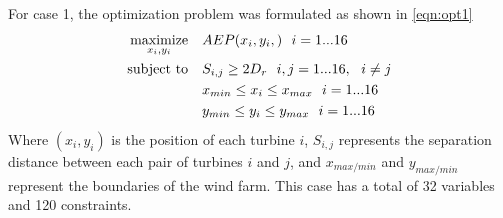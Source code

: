\documentclass[a4paper]{jpconf}
\begin{document}
For case 1, the optimization problem was formulated as shown in \cref{eqn:opt1}
%
\begin{equation}
	\label{eqn:opt1}
	\begin{aligned} [b]
	\underset{x_i,y_i}{\textrm{maximize}} \quad & AEP(x_i,y_i,)~~i=1...16\\
	\textrm{subject to} \quad & S_{i,j} \geq 2\*D_{r}~~i,j=1...16,~~i \neq j\\
	 & x_{min} \leq x_i \leq x_{max}~~i=1...16\\
     & y_{min} \leq y_i \leq y_{max}~~i=1...16
	\end{aligned}
\end{equation}
%
Where $(x_i,y_i)$ is the position of each turbine $i$, $S_{i,j}$ represents the separation distance between each pair of turbines $i$ and $j$, and $x_{max/min}$ and $y_{max/min}$ represent the boundaries of the wind farm. This case has a total of 32 variables and 120 constraints.
\end{document}
